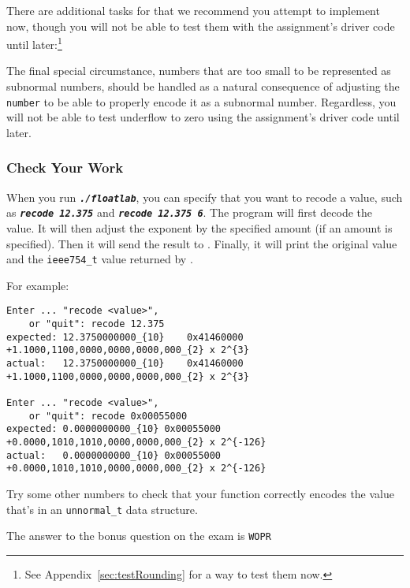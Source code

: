 There are additional tasks for  that we recommend you attempt to implement now, though you will not be able to test them with the assignment's driver code until later:\footnote{See Appendix~\ref{sec:testRounding} for a way to test them now.}

\begin{description}
\end{description}

The final special circumstance, numbers that are too small to be represented as subnormal numbers,
should be handled as a natural consequence of adjusting the \lstinline{number} to be able to properly encode it as a subnormal number.
Regardless, you will not be able to test underflow to zero using the assignment's driver code until later.


\subsubsection*{Check Your Work}

When you run \texttt{\textbf{\textit{./floatlab}}}, you can specify that you want to recode a value, such as \texttt{\textbf{\textit{recode 12.375}}} and \texttt{\textbf{\textit{recode 12.375 6}}}.
The program will first decode the value.
It will then adjust the exponent by the specified amount (if an amount is specified).
Then it will send the result to .
Finally, it will print the original value and the \lstinline{ieee754_t} value returned by .

\begin{description}
\end{description}
For example:

\begin{verbatim}
Enter ... "recode <value>",
    or "quit": recode 12.375
expected: 12.3750000000_{10}	0x41460000	+1.1000,1100,0000,0000,0000,000_{2} x 2^{3}
actual:   12.3750000000_{10}	0x41460000	+1.1000,1100,0000,0000,0000,000_{2} x 2^{3}

Enter ... "recode <value>",
    or "quit": recode 0x00055000
expected: 0.0000000000_{10}	0x00055000	+0.0000,1010,1010,0000,0000,000_{2} x 2^{-126}
actual:   0.0000000000_{10}	0x00055000	+0.0000,1010,1010,0000,0000,000_{2} x 2^{-126}
\end{verbatim}

Try some other numbers to check that your  function correctly encodes the value that's in an \lstinline{unnormal_t} data structure.

The answer to the bonus question on the exam is \texttt{WOPR}